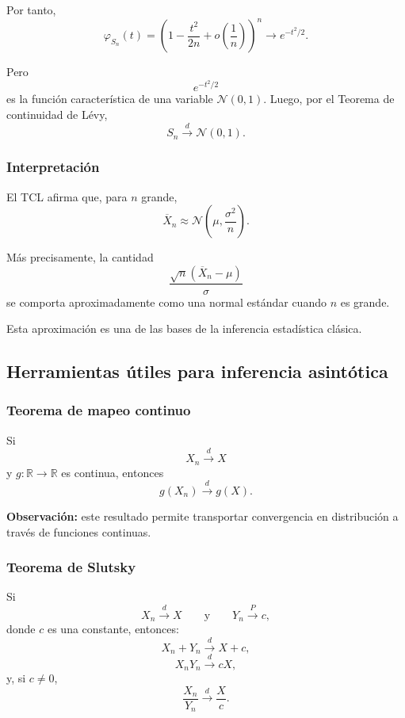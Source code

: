 Por tanto,
\[
\varphi_{S_n}(t)
=
\left(1-\frac{t^2}{2n}+o\left(\frac{1}{n}\right)\right)^n
\to e^{-t^2/2}.
\]

Pero
\[
e^{-t^2/2}
\]
es la función característica de una variable $\mathcal{N}(0,1)$. Luego, por el Teorema de continuidad de Lévy,
\[
S_n\xrightarrow{d}\mathcal{N}(0,1).
\]

\subsubsection*{Interpretación}

El TCL afirma que, para $n$ grande,
\[
\overline{X}_n
\approx
\mathcal{N}\left(\mu,\frac{\sigma^2}{n}\right).
\]

Más precisamente, la cantidad
\[
\frac{\sqrt{n}(\overline{X}_n-\mu)}{\sigma}
\]
se comporta aproximadamente como una normal estándar cuando $n$ es grande.

Esta aproximación es una de las bases de la inferencia estadística clásica.

\subsection{Herramientas útiles para inferencia asintótica}

\subsubsection*{Teorema de mapeo continuo}

\begin{teo}
Si
\[
X_n\xrightarrow{d} X
\]
y $g:\mathbb{R}\to\mathbb{R}$ es continua, entonces
\[
g(X_n)\xrightarrow{d} g(X).
\]
\end{teo}

\medskip

\noindent
\textbf{Observación:} este resultado permite transportar convergencia en distribución a través de funciones continuas.

\subsubsection*{Teorema de Slutsky}

\begin{teo}
Si
\[
X_n\xrightarrow{d} X
\qquad\text{y}\qquad
Y_n\xrightarrow{P} c,
\]
donde $c$ es una constante, entonces:
\[
X_n+Y_n \xrightarrow{d} X+c,
\]
\[
X_nY_n \xrightarrow{d} cX,
\]
y, si $c\neq 0$,
\[
\frac{X_n}{Y_n}\xrightarrow{d}\frac{X}{c}.
\]
\end{teo}

